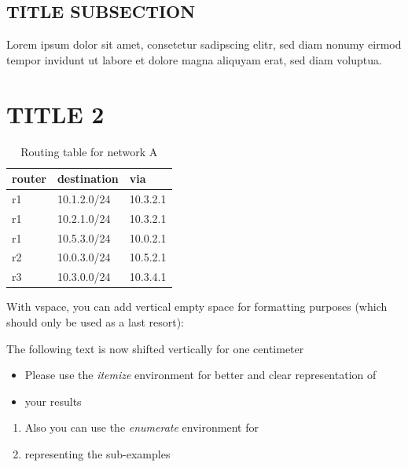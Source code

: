 \documentclass[parskip=full]{scrartcl}
\begin{document}
\subsection{TITLE SUBSECTION}
Lorem ipsum dolor sit amet, consetetur sadipscing elitr, sed diam nonumy eirmod tempor invidunt ut labore et dolore magna aliquyam erat, sed diam voluptua.

\section{TITLE 2}
\begin{table}[hb]
    \centering
    \caption{Routing table for network A}
    \label{tab:routing}
    \begin{tabular}{lll}
        \toprule
        \textbf{router} & \textbf{destination} & \textbf{via}  \\ \midrule
        r1 & 10.1.2.0/24 & 10.3.2.1 \\
        r1 & 10.2.1.0/24 & 10.3.2.1 \\
        r1 & 10.5.3.0/24 & 10.0.2.1 \\
        \midrule
        r2 & 10.0.3.0/24 & 10.5.2.1 \\
        \midrule
        r3 & 10.3.0.0/24 & 10.3.4.1 \\
        \bottomrule
    \end{tabular}
\end{table}
With vspace, you can add vertical empty space for formatting purposes (which should only be used as a last resort):
\vspace*{1cm}

The following text is now shifted vertically for one centimeter

\begin{itemize}
\item Please use the \textit{itemize} environment for better and clear representation of
\item your results
\end{itemize}

\begin{enumerate}
\item Also you can use the \textit{enumerate} environment for 
\item representing the sub-examples
\end{enumerate}
\end{document}
